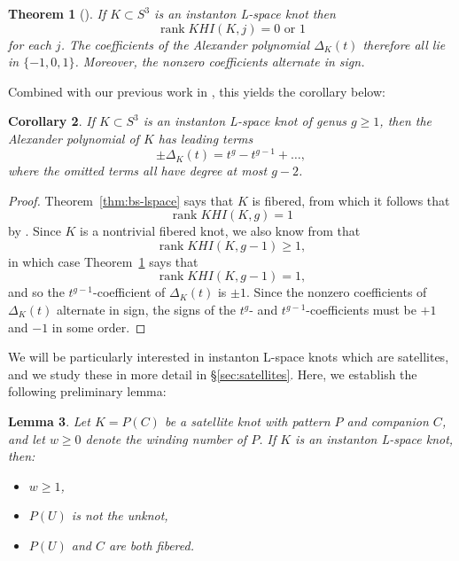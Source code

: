 \documentclass[11pt]{amsart}
\newtheorem {theorem}{Theorem}
\newtheorem {lemma}[theorem]{Lemma}
\newtheorem {corollary}[theorem]{Corollary}
\numberwithin{equation}{section}
\numberwithin{theorem}{section}
\theoremstyle{definition}
\newcommand\KHI{\mathit{KHI}}
\begin{document}
\begin{theorem}[] \label{thm:ly-lspace}
If $K \subset S^3$ is an instanton L-space knot then 
\[ \operatorname{rank} \KHI(K,j) = 0\text{ or }1 \]
for each $j$.  The coefficients of the Alexander polynomial $\Delta_K(t)$ therefore all lie in $\{-1,0,1\}$. Moreover, the nonzero coefficients alternate in sign.
\end{theorem}

Combined with our previous work in \cite{bs-trefoil}, this yields the corollary below:

\begin{corollary} \label{cor:lspace-top-two}
If $K\subset S^3$ is an instanton L-space knot of genus $g \geq 1$, then the Alexander polynomial of $K$ has leading terms 
\[ \pm \Delta_K(t) = t^g - t^{g-1} + \ldots, \]
where the omitted terms all have degree at most $g-2$.
\end{corollary}

\begin{proof}
Theorem~\ref{thm:bs-lspace} says that $K$ is fibered, from which it follows that \[ \operatorname{rank} \KHI(K,g) = 1 \]
by \cite[Corollary~7.19]{km-excision}.  Since $K$ is a nontrivial fibered knot, we also know from \cite[Theorem~1.7]{bs-trefoil} that
\[ \operatorname{rank} \KHI(K,g-1) \geq 1, \]
 in which case Theorem~\ref{thm:ly-lspace} says that \[\operatorname{rank} \KHI(K,g-1)=1,\] and so the $t^{g-1}$-coefficient of $\Delta_K(t)$ is $\pm1$.  Since the nonzero coefficients of $\Delta_K(t)$ alternate in sign, the signs of the $t^g$- and $t^{g-1}$-coefficients must be $+1$ and $-1$ in some order.
\end{proof}

We will be particularly interested in instanton L-space knots which are satellites, and we study these in more detail in \S\ref{sec:satellites}. Here, we establish the following preliminary lemma:

\begin{lemma} \label{lem:satellite-lspace}
Let $K = P(C)$ be a  satellite knot with pattern $P$ and companion $C$, and let $w \geq 0$ denote the winding number of $P$.  If $K$ is an instanton L-space knot, then:
\begin{itemize}
\item $w \geq 1$,
\item $P(U)$ is not the unknot,
\item $P(U)$ and $C$ are both fibered.
\end{itemize}
\end{lemma}
\end{document}
